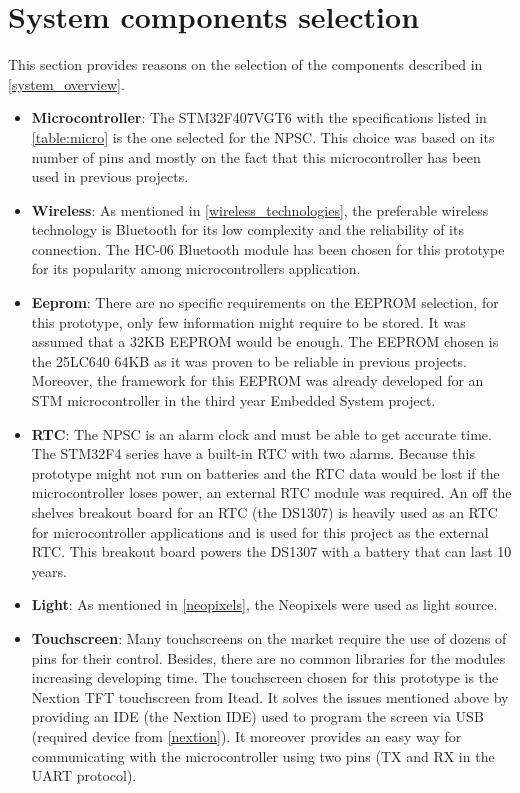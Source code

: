 \section{System components selection}
This section provides reasons on the selection of the components described in \ref{system_overview}.  
\begin{itemize}
\item \textbf{Microcontroller}: The STM32F407VGT6 with the specifications listed in \cref{table:micro} is the one selected for the NPSC. This choice was based on its number of pins and mostly on the fact that this microcontroller has been used in previous projects. 
\item \textbf{Wireless}: As mentioned in \ref{wireless_technologies}, the preferable wireless technology is Bluetooth for its low complexity and the reliability of its connection. The HC-06 Bluetooth module has been chosen for this prototype for its popularity among microcontrollers application.
\item \textbf{Eeprom}: There are no specific requirements on the EEPROM selection, for this prototype, only few information might require to be stored. It was assumed that a 32KB EEPROM would be enough. The EEPROM chosen is the 25LC640 64KB as it was proven to be reliable in previous projects. Moreover, the framework for this EEPROM was already developed for an STM microcontroller in the third year Embedded System project.  
\item \textbf{RTC}: The NPSC is an alarm clock and must be able to get accurate time. The STM32F4 series have a built-in RTC with two alarms. Because this prototype might not run on batteries and the RTC data would be lost if the microcontroller loses power, an external RTC module was required. An off the shelves breakout board for an RTC (the DS1307) is heavily used as an RTC for microcontroller applications and is used for this project as the external RTC. This breakout board powers the DS1307 with a battery that can last 10 years.
\item \textbf{Light}: As mentioned in \ref{neopixels}, the Neopixels were used as light source.
\item \textbf{Touchscreen}: Many touchscreens on the market require the use of dozens of pins for their control. Besides, there are no common libraries for the modules increasing developing time. The touchscreen chosen for this prototype is the Nextion TFT touchscreen from Itead. It solves the issues mentioned above by providing an IDE (the Nextion IDE) used to program the screen via USB (required device from \ref{nextion}). It moreover provides an easy way for communicating with the microcontroller using two pins (TX and RX in the UART protocol).
\end{itemize}

